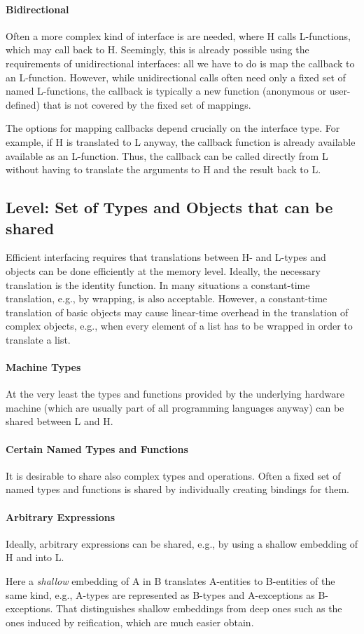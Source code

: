 \paragraph{Bidirectional}
Often a more complex kind of interface is are needed, where H calls L-functions, which may call back to H.
Seemingly, this is already possible using the requirements of unidirectional interfaces: all we have to do is map the callback to an L-function.
However, while unidirectional calls often need only a fixed set of named L-functions, the callback is typically a new function (anonymous or user-defined) that is not covered by the fixed set of mappings.

The options for mapping callbacks depend crucially on the interface type.
For example, if H is translated to L anyway, the callback function is already available available as an L-function.
Thus, the callback can be called directly from L without having to translate the arguments to H and the result back to L.


\subsection{Level: Set of Types and Objects that can be shared}

Efficient interfacing requires that translations between H- and L-types and objects can be done efficiently at the memory level.
Ideally, the necessary translation is the identity function.
In many situations a constant-time translation, e.g., by wrapping, is also acceptable.
However, a constant-time translation of basic objects may cause linear-time overhead in the translation of complex objects, e.g., when every element of a list has to be wrapped in order to translate a list.

\paragraph{Machine Types}
At the very least the types and functions provided by the underlying hardware machine (which are usually part of all programming languages anyway) can be shared between L and H.

\paragraph{Certain Named Types and Functions}
It is desirable to share also complex types and operations.
Often a fixed set of named types and functions is shared by individually creating bindings for them.

\paragraph{Arbitrary Expressions}
Ideally, arbitrary expressions can be shared, e.g., by using a shallow embedding of H and into L.

Here a \emph{shallow} embedding of A in B translates A-entities to B-entities of the same kind, e.g., A-types are represented as B-types and A-exceptions as B-exceptions.
That distinguishes shallow embeddings from deep ones such as the ones induced by reification, which are much easier obtain.